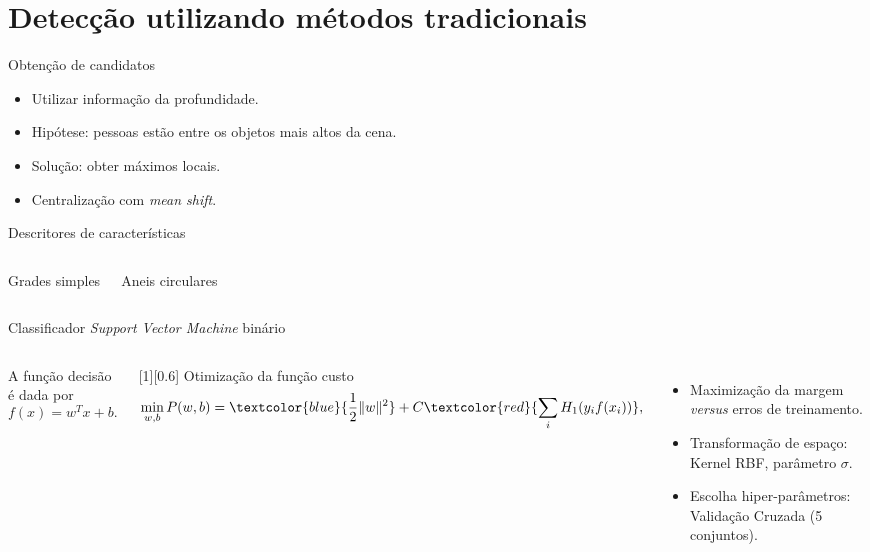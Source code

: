 \section{Detecção utilizando métodos tradicionais}

\begin{frame}{Obtenção de candidatos}
	\begin{itemize}
	\item<1-> Utilizar informação da profundidade.
	\item<2-> Hipótese: pessoas estão entre os objetos mais altos da cena.
	\item<2-> Solução: obter máximos locais.
	\item<2-> Centralização com \textit{mean shift}.
	\end{itemize}

\end{frame}

\begin{frame}{Descritores de características}
	\begin{columns}[T]
	\center Grades simples


	\center Aneis circulares

	\end{columns}
\end{frame}


\begin{frame}{Classificador \textit{Support Vector Machine} binário}
	\begin{columns}[T]
	A função decisão é dada por
	\begin{equation*}
	f(x)=w^T x+ b.
	\end{equation*}

	[0.6]
	Otimização da função custo
	\begin{equation*}
		\label{eq:svm-cost}
		\min_{w,b} P(w,b) = \textcolor{blue}{\frac{1}{2}\|w\|^2} + C\textcolor{red}{\sum_i H_1(y_i f(x_i))},
	\end{equation*}

	\begin{itemize}
		\item Maximização da margem \emph{versus} erros de treinamento.
		\item Transformação de espaço: Kernel RBF, parâmetro $\sigma$.
		\item Escolha hiper-parâmetros: Validação Cruzada (5 conjuntos).
	\end{itemize}
	\end{columns}
\end{frame}

